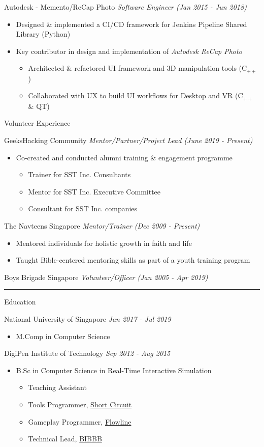 \documentclass[letterpaper,11pt]{article}
\newcommand{\cvtitle}[1]{\huge\raggedright \textcolor{section_color}{#1}\\}
\newcommand{\cvhead}[1]{\large\raggedright \textcolor{subsection_color}{#1}\\}
\newcommand{\cvlist}[1]{\vspace{-12pt}\small \textcolor{item_color}{\begin{itemize}#1\end{itemize}}}
\newcommand{\cvli}[1]{\vspace{-4pt} \item{#1}}
\newcommand{\cvline}[0]{\noindent\rule{19cm}{0.4pt}}
\newcommand{\link}[2]{\textcolor{link_color}{\href{#1}{#2}}}
\newcommand{\qualifier}[1]{\hfill \textsl{\footnotesize #1}}
\begin{document}
\cvhead{Autodesk - Memento/ReCap Photo \qualifier{Software Engineer (Jan 2015 - Jun 2018)}}
\cvlist{
    \cvli{Designed \& implemented a CI/CD framework for Jenkins Pipeline Shared Library (Python)}
    \cvli{Key contributor in design and implementation of \textit{Autodesk ReCap Photo}
        \vspace{12pt}
        \cvlist{
            \cvli{Architected \& refactored UI framework and 3D manipulation tools (C$_{++}$)}
            \cvli{Collaborated with UX to build UI workflows for Desktop and VR (C$_{++}$ \& QT)}
        }
    }
}

\cvtitle{Volunteer Experience}

\cvhead{GeeksHacking Community \qualifier{Mentor/Partner/Project Lead (June 2019 - Present)}}
\cvlist{
    \cvli{Co-created and conducted alumni training \& engagement programme}
    \cvlist{
        \vspace{12pt}
        \cvli{Trainer for SST Inc. Consultants}
        \cvli{Mentor for SST Inc. Executive Committee}
        \cvli{Consultant for SST Inc. companies}
    }
}

\cvhead{The Navteens Singapore \qualifier{Mentor/Trainer (Dec 2009 - Present)}}
\cvlist{
    \cvli{Mentored individuals for holistic growth in faith and life}
    \cvli{Taught Bible-centered mentoring skills as part of a youth training program}
}

\cvhead{Boys Brigade Singapore \qualifier{Volunteer/Officer (Jan 2005 - Apr 2019)}}

\cvline

\cvtitle{Education}
\cvhead{National University of Singapore \qualifier{Jan 2017 - Jul 2019}}
\cvlist{
    \cvli{
        \cvhead{M.Comp in Computer Science}
    }
}

\cvhead{DigiPen Institute of Technology \qualifier{Sep 2012 - Aug 2015}}
\cvlist{
    \cvli{
        \cvhead{B.Sc in Computer Science in Real-Time Interactive Simulation}
        \cvlist{
            \cvli{Teaching Assistant}
            \cvli{Tools Programmer, \link{http://games.digipen.edu/games/shortcircuit}{Short Circuit}}
            \cvli{Gameplay Programmer, \link{http://games.digipen.edu/games/flowline}{Flowline}}
            \cvli{Technical Lead, \link{http://games.digipen.edu/games/bibbb}{BIBBB}}
        }
    }
}
\end{document}
